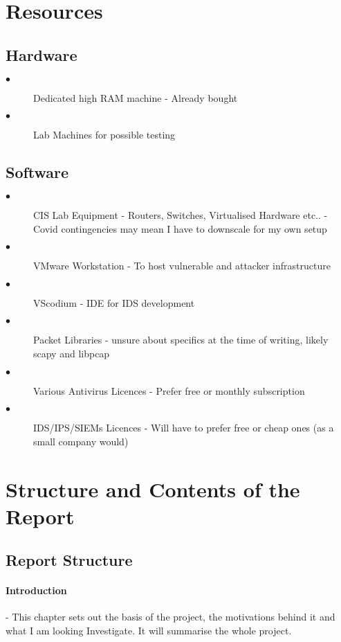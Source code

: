 \section{Resources}
\subsection{Hardware}
\begin{description}
	\item[$\bullet$] Dedicated high RAM machine - Already bought
	\item[$\bullet$] Lab Machines for possible testing
\end{description}

\subsection{Software}
\begin{description}
	\item[$\bullet$] CIS Lab Equipment - Routers, Switches, Virtualised Hardware etc.. - Covid contingencies may mean I have to downscale for my own setup
	\item[$\bullet$] VMware Workstation - To host vulnerable and attacker infrastructure
	\item[$\bullet$] VScodium - IDE for IDS development
	\item[$\bullet$] Packet Libraries - unsure about specifics at the time of writing, likely scapy and libpcap
	\item[$\bullet$] Various Antivirus Licences - Prefer free or monthly subscription
	\item[$\bullet$] IDS/IPS/SIEMs Licences - Will have to prefer free or cheap ones (as a small company would)
\end{description}

\section{Structure and Contents of the Report}
\subsection{Report Structure}

\paragraph{Introduction} - This chapter sets out the basis of the project, the motivations behind it and what I am looking Investigate. 
It will summarise the whole project.

